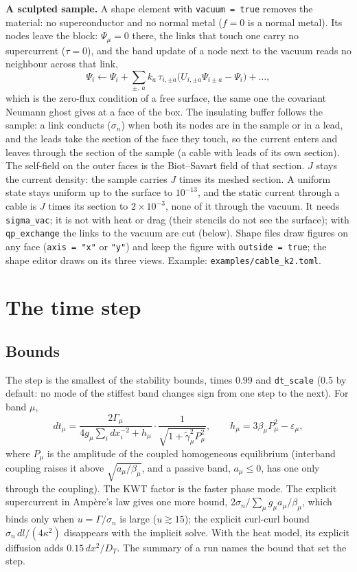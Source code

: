 \documentclass[11pt,a4paper]{article}
\newcommand{\code}[1]{\texttt{#1}}
\newcommand{\gt}{\tilde\gamma}
\begin{document}
\textbf{A sculpted sample.} A shape element with \code{vacuum = true} removes the material: no superconductor and no
normal metal ($f = 0$ is a normal metal). Its nodes leave the block: $\Psi_\mu = 0$ there, the links that touch one carry
no supercurrent ($\tau = 0$), and the band update of a node next to the vacuum reads no neighbour across that link,
\begin{equation}
  \Psi_i \leftarrow \Psi_i + \sum_{\pm,\,a} k_a\,\tau_{i,\pm a}\bigl(U_{i,\pm a}\Psi_{i\pm a} - \Psi_i\bigr) + \dots,
\end{equation}
which is the zero-flux condition of a free surface, the same one the covariant Neumann ghost gives at a face of the box.
The insulating buffer follows the sample: a link conducts ($\sigma_n$) when both its nodes are in the sample or in a lead,
and the leads take the section of the face they touch, so the current enters and leaves through the section of the sample
(a cable with leads of its own section). The self-field on the outer faces is the Biot--Savart field of that section. $J$
stays the current density: the sample carries $J$ times its meshed section. A uniform state stays uniform up to the surface
to $10^{-13}$, and the static current through a cable is $J$ times its section to $2\times10^{-3}$, none of it through the
vacuum. It needs \code{sigma\_vac}; it is not with heat or drag (their stencils do not see the surface); with
\code{qp\_exchange} the links to the vacuum are cut (below).
Shape files draw figures on any face (\code{axis = "x"} or \code{"y"}) and keep the figure with \code{outside = true}; the
shape editor draws on its three views. Example: \code{examples/cable\_k2.toml}.

\section{The time step}

\subsection{Bounds}

The step is the smallest of the stability bounds, times 0.99 and \code{dt\_scale} (0.5 by default: no mode of the
stiffest band changes sign from one step to the next). For band $\mu$,
\begin{equation}
  dt_\mu = \frac{2\Gamma_\mu}{4 g_\mu \sum_i dx_i^{-2} + h_\mu}\cdot\frac{1}{\sqrt{1+\gt_\mu^2P_\mu^2}}, \qquad
  h_\mu = 3\beta_\mu P_\mu^2 - \varepsilon_\mu ,
\end{equation}
where $P_\mu$ is the amplitude of the coupled homogeneous equilibrium (interband coupling raises it above
$\sqrt{a_\mu/\beta_\mu}$, and a passive band, $a_\mu \le 0$, has one only through the coupling). The KWT factor is the
faster phase mode. The explicit supercurrent in Amp\`ere's law gives one more bound, $2\sigma_n/\sum_\mu g_\mu a_\mu/\beta_\mu$,
which binds only when $u = \Gamma/\sigma_n$ is large ($u \gtrsim 15$); the explicit curl-curl bound
$\sigma_n\,dl/(4\kappa^2)$ disappears with the implicit solve. With the heat model, its explicit diffusion adds
$0.15\,dx^2/D_T$. The summary of a run names the bound that set the step.
\end{document}

